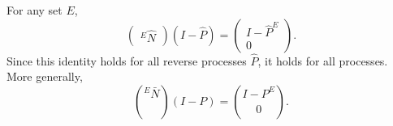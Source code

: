 For any set $E$,
$$\begin{pmatrix} {}^E \hat{N} \end{pmatrix} (I - \hat{P}) = \begin{pmatrix} I - \hat{P}^E \\ 0 \end{pmatrix}.$$
Since this identity holds for all reverse processes $\hat{P}$, it holds for all processes. More generally,
$$\binom{{}^E \bar{N}}{}(I - P) = \binom{I - P^E}{0}.$$
